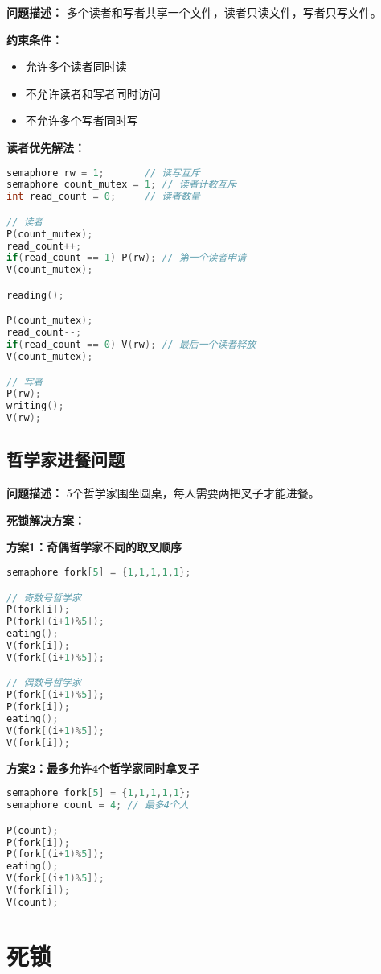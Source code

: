 \documentclass[lang=cn,newtx,10pt,scheme=chinese]{../../elegantbook}
\begin{document}
\textbf{问题描述：}
多个读者和写者共享一个文件，读者只读文件，写者只写文件。

\textbf{约束条件：}
\begin{itemize}
  \item 允许多个读者同时读
  \item 不允许读者和写者同时访问
  \item 不允许多个写者同时写
\end{itemize}

\textbf{读者优先解法：}
\begin{lstlisting}[language=C]
semaphore rw = 1;       // 读写互斥
semaphore count_mutex = 1; // 读者计数互斥
int read_count = 0;     // 读者数量

// 读者
P(count_mutex);
read_count++;
if(read_count == 1) P(rw); // 第一个读者申请
V(count_mutex);

reading();

P(count_mutex);
read_count--;
if(read_count == 0) V(rw); // 最后一个读者释放
V(count_mutex);

// 写者
P(rw);
writing();
V(rw);
\end{lstlisting}

\subsection{哲学家进餐问题}

\textbf{问题描述：}
5个哲学家围坐圆桌，每人需要两把叉子才能进餐。

\textbf{死锁解决方案：}

\textbf{方案1：奇偶哲学家不同的取叉顺序}
\begin{lstlisting}[language=C]
semaphore fork[5] = {1,1,1,1,1};

// 奇数号哲学家
P(fork[i]);
P(fork[(i+1)%5]);
eating();
V(fork[i]);
V(fork[(i+1)%5]);

// 偶数号哲学家
P(fork[(i+1)%5]);
P(fork[i]);
eating();
V(fork[(i+1)%5]);
V(fork[i]);
\end{lstlisting}
\textbf{方案2：最多允许4个哲学家同时拿叉子}
\begin{lstlisting}[language=C]
semaphore fork[5] = {1,1,1,1,1};
semaphore count = 4; // 最多4个人

P(count);
P(fork[i]);
P(fork[(i+1)%5]);
eating();
V(fork[(i+1)%5]);
V(fork[i]);
V(count);
\end{lstlisting}

\section{死锁}
\end{document}
